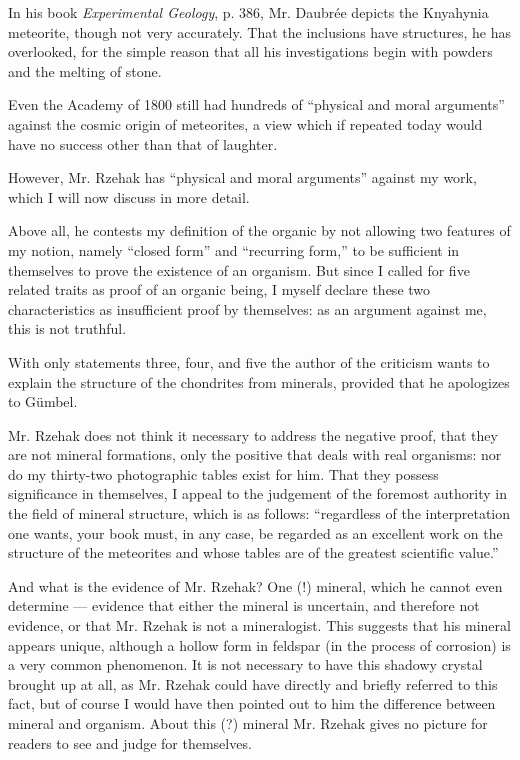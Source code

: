 \documentclass[a4paper, 12pt, oneside]{article}
\begin{document}
In his book \emph{Experimental Geology}, p. 386, Mr. Daubrée depicts the Knyahynia meteorite, though not very accurately. That the inclusions have structures, he has overlooked, for the simple reason that all his investigations begin with powders and the melting of stone.

Even the Academy of 1800 still had hundreds of ``physical and moral arguments'' against the cosmic origin of meteorites, a view which if repeated today would have no success other than that of laughter.

However, Mr. Rzehak has ``physical and moral arguments'' against my work, which I will now discuss in more detail.

Above all, he contests my definition of the organic by not allowing two features of my notion, namely ``closed form'' and ``recurring form,'' to be sufficient in themselves to prove the existence of an organism. But since I called for five related traits as proof of an organic being, I myself declare these two characteristics as insufficient proof by themselves: as an argument against me, this is not truthful.

With only statements three, four, and five the author of the criticism wants to explain the structure of the chondrites from minerals, provided that he apologizes to Gümbel.

Mr. Rzehak does not think it necessary to address the negative proof, that they are not mineral formations, only the positive that deals with real organisms: nor do my thirty-two photographic tables exist for him. That they possess significance in themselves, I appeal to the judgement of the foremost authority in the field of mineral structure, which is as follows: ``regardless of the interpretation one wants, your book must, in any case, be regarded as an excellent work on the structure of the meteorites and whose tables are of the greatest scientific value.''

And what is the evidence of Mr. Rzehak? One (!) mineral, which he cannot even determine --- evidence that either the mineral is uncertain, and therefore not evidence, or that Mr. Rzehak is not a mineralogist. This suggests that his mineral appears unique, although a hollow form in feldspar (in the process of corrosion) is a very common phenomenon. It is not necessary to have this shadowy crystal brought up at all, as Mr. Rzehak could have directly and briefly referred to this fact, but of course I would have then pointed out to him the difference between mineral and organism. About this (?) mineral Mr. Rzehak gives no picture for readers to see and judge for themselves.
\end{document}
